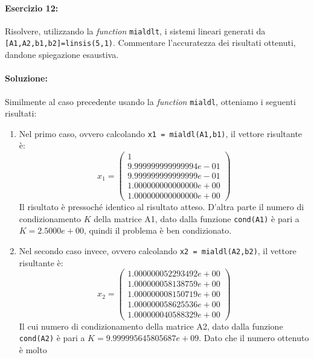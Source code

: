 \documentclass[12pt]{article}
\begin{document}
\paragraph{Esercizio 12:} Risolvere, utilizzando la \textit{function} \texttt{mialdlt}, i sistemi lineari generati da\\ \texttt{[A1,A2,b1,b2]=linsis(5,1)}. 
Commentare l’accuratezza dei risultati ottenuti, dandone spiegazione esaustiva.
\paragraph{Soluzione:}
Similmente al caso precedente usando la \textit{function} \texttt{mialdl}, otteniamo i seguenti risultati:
\begin{enumerate}
    \item Nel primo caso, ovvero calcolando \texttt{x1 = mialdl(A1,b1)}, il vettore risultante è: 
    \begin{equation*} x_1=
        \begin{pmatrix}
            1\\
            9.999999999999994e-01\\
            9.999999999999999e-01\\
            1.000000000000000e+00\\
            1.000000000000000e+00
        \end{pmatrix}
    \end{equation*}
    Il risultato è pressoché identico al risultato atteso. D'altra parte il numero di condizionamento \(K\) della matrice A1, dato dalla funzione \texttt{cond(A1)}
    è pari a \(K = 2.5000e+00\), quindi il problema è  ben condizionato.
    \item Nel secondo caso invece, ovvero calcolando \texttt{x2 = mialdl(A2,b2)}, il vettore risultante è:
    \begin{equation*} x_2=
        \begin{pmatrix}
            1.000000052293492e+00\\
            1.000000058138759e+00\\
            1.000000008150719e+00\\
            1.000000058625536e+00\\
            1.000000040588329e+00
        \end{pmatrix}
    \end{equation*}
    Il cui numero di condizionamento della matrice A2, dato dalla funzione \texttt{cond(A2)} è pari a \(K = 9.999995645805687e+09\). Dato che il numero ottenuto è molto 

\end{enumerate}
\end{document}
